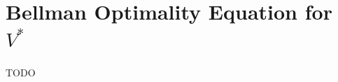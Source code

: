 %
%
%
%


\section{Bellman Optimality Equation for $V^*$}\label{sec:bellman-optimality-equation-for-v}
TODO
%
%
%
%
%
%
%
%
%
%
%
%
%

